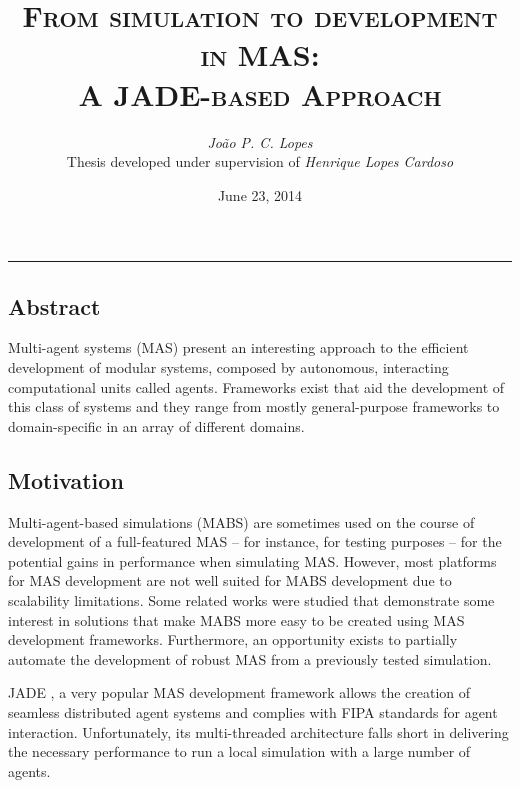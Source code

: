 \documentclass[9pt,a4paper]{extarticle}
\begin{document}
\title{\vspace*{-8mm}\textbf{\textsc{
  From simulation to development in MAS:\\
  A JADE-based Approach
}}}
\author{
  \emph{João P. C. Lopes}\\[2mm]
  \small{Thesis developed under supervision of \emph{Henrique Lopes Cardoso}}
}
\date{June 23, 2014}
\maketitle
\thispagestyle{empty}

\vspace*{-4mm}\noindent\rule{\textwidth}{0.4pt}\vspace*{4mm}

\begin{multicols}{2}

\section{Abstract}

Multi-agent systems (MAS) present an interesting approach to the efficient development of modular systems, composed by autonomous, interacting computational units called agents. Frameworks exist that aid the development of this class of systems and they range from mostly general-purpose frameworks to domain-specific in an array of different domains.

\subsection{Motivation}
Multi-agent-based simulations (MABS) are sometimes used on the course of development of a full-featured MAS -- for instance, for testing purposes -- for the potential gains in performance when simulating MAS. 
However, most platforms for MAS development are not well suited for MABS development due to scalability limitations\cite{mengistu2008scalability}. Some related works were studied that demonstrate some interest in solutions that make MABS more easy to be created using MAS development frameworks. Furthermore, an opportunity exists to partially automate the development of robust MAS from a previously tested simulation.

JADE \cite{bellifemine2007developing}, a very popular MAS development framework allows the creation of seamless distributed agent systems and complies with FIPA standards for agent interaction. Unfortunately, its multi-threaded architecture falls short in delivering the necessary performance to run a local simulation with a large number of agents.


\end{multicols}
\end{document}
